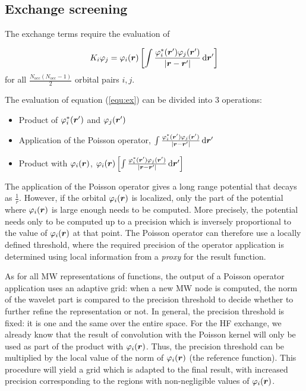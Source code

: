 \documentclass[journal=jctcce, manuscript=article]{achemso}
\begin{document}
\subsection{Exchange screening}
\label{Xscreen}

The exchange terms require the evaluation of

\begin{equation}
\label{equ:ex}
  K_i \varphi_j = \varphi_i(\boldsymbol{r}) 
  \left[
  \int \frac{\varphi^*_i(\boldsymbol{r}')\varphi_j(\boldsymbol{r}')}{|\boldsymbol{r}-\boldsymbol{r}'|} \, \mathrm{d}\boldsymbol{r}'
  \right]
\end{equation}
 for all $\frac{N_{\mathrm{occ}}(N_{\mathrm{occ}}-1)}{2}$ orbital pairs $i,j$.

The evaluation of equation (\ref{equ:ex}) can be divided into 3 operations:
\begin{itemize}
\item Product of $\varphi^*_i(\boldsymbol{r}')$ and $\varphi_j(\boldsymbol{r}')$
\item Application of the Poisson operator, $\int \frac{\varphi^*_i(\boldsymbol{r}')\varphi_j(\boldsymbol{r}')}{|\boldsymbol{r}-\boldsymbol{r}'|} \, \mathrm{d}\boldsymbol{r}'$
\item Product with $\varphi_i(\boldsymbol{r})$, $\varphi_i(\boldsymbol{r}) \left[\int \frac{\varphi^*_i(\boldsymbol{r}')\varphi_j(\boldsymbol{r}')}{|\boldsymbol{r}-\boldsymbol{r}'|} \, \mathrm{d}\boldsymbol{r}'\right]$
\end{itemize}

The application of the Poisson operator gives a long range potential that decays as $\frac{1}{r}$. However, if the orbital $\varphi_i(\boldsymbol{r})$ is localized, only the part of the potential where $\varphi_i(\boldsymbol{r})$ is large enough needs to be computed. More precisely, the potential needs only to be computed up to a precision which is inversely proportional to the value of $\varphi_i(\boldsymbol{r})$ at that point. The Poisson operator can therefore use a locally defined threshold, where the required precision of the operator application is determined using local information from a \emph{proxy} for the result function.

As for all \ac{MW} representations of functions, the output of a Poisson operator application uses an adaptive grid: when a new \ac{MW} node is computed, the norm of the wavelet part is compared to the precision threshold to decide whether to further refine the representation or not. In general, the precision threshold is fixed: it is one and the same over the entire space. For the \ac{HF} exchange, we already know that the result of convolution with the Poisson kernel will only be used as part of the product with $\varphi_i(\boldsymbol{r})$. Thus, the precision threshold can be multiplied by the local value of the norm of $\varphi_i(\boldsymbol{r})$ (the reference function). This procedure will yield a grid which is adapted to the final result, with increased precision corresponding to the regions with non-negligible values of $\varphi_i(\boldsymbol{r})$.
\end{document}
